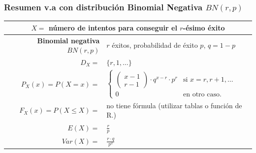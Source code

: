 \documentclass[handout]{beamer}\usepackage[]{graphicx}\usepackage[]{color}
\renewcommand{\leq}{\leqslant}
\theoremstyle{plain}
\theoremstyle{definition}
\begin{document}
\begin{frame}[fragile]
\frametitle{Resumen v.a con distribución Binomial Negativa $BN(r,p)$}
\scriptsize
\setlength{\tabcolsep}{1pt}
\begin{table}
\centering
\begin{tabular}{|rl|}
\hline
\multicolumn{2}{|c|}{$X=$ número de intentos para conseguir el $r$-ésimo éxito}\\
\hline
\hline
\textbf{Binomial negativa}  $BN(r,p)$ & $r$ éxitos, probabilidad de éxito $p$, $q=1-p$\\
\hline \hline
$D_X=$ &  $\{r,1,\ldots\}$ 
\\\hline
$P_X(x)=P(X=x)=$ &
$\left\{
\begin{array}{cc}
\left(
\begin{array}{c}
x-1\\ r-1
\end{array}
\right)\cdot
q^{x-r}\cdot p^r & \mbox{si }  x=r,r+1,\ldots \\
0 & \mbox{en otro caso.}
\end{array}
\right.$
\\
\hline
$F_X(x)=P(X\leq X)=$ & no tiene fórmula (utilizar tablas o función de R.)\\
\hline
$E(X)=$ &  $\frac{r}{p}$\\
$Var(X)=$ & $\frac{r\cdot q}{p^2}$ \\
\hline
\end{tabular}
\end{table}

\normalsize

\end{frame}
\end{document}
